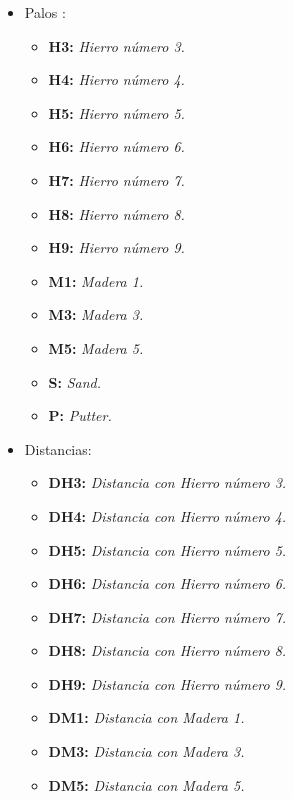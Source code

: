\documentclass[runningheads,a4paper]{llncs}
\begin{document}
\begin{itemize}
  \item Palos :
	\\
	\begin{itemize}
    \item \textbf{H3:} \textit{Hierro número 3.}
    \item \textbf{H4:} \textit{Hierro número 4.}
    \item \textbf{H5:} \textit{Hierro número 5.}
    \item \textbf{H6:} \textit{Hierro número 6.}
    \item \textbf{H7:} \textit{Hierro número 7.}
    \item \textbf{H8:} \textit{Hierro número 8.}
    \item \textbf{H9:} \textit{Hierro número 9.}
    \item \textbf{M1:} \textit{Madera 1.}
    \item \textbf{M3:} \textit{Madera 3.}
    \item \textbf{M5:} \textit{Madera 5.}
    \item \textbf{S:} \textit{Sand.}
    \item \textbf{P:} \textit{Putter.}\\
  \end{itemize}
\item Distancias:
\\
  \begin{itemize}
    \item \textbf{DH3:} \textit{Distancia con Hierro número 3.}
    \item \textbf{DH4:} \textit{Distancia con Hierro número 4.}
    \item \textbf{DH5:} \textit{Distancia con Hierro número 5.}
    \item \textbf{DH6:} \textit{Distancia con Hierro número 6.}
    \item \textbf{DH7:} \textit{Distancia con  Hierro número 7.}
    \item \textbf{DH8:} \textit{Distancia con Hierro número 8.}
    \item \textbf{DH9:} \textit{Distancia con Hierro número 9.}
    \item \textbf{DM1:} \textit{Distancia con Madera 1.}
    \item \textbf{DM3:} \textit{Distancia con Madera 3.}
    \item \textbf{DM5:} \textit{Distancia con Madera 5.}
   \end{itemize}
\end{itemize}
\end{document}
